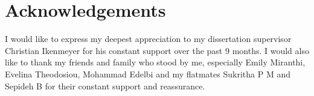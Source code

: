 \section*{Acknowledgements}

\vspace{2cm}

\large

I would like to express my deepest appreciation to my dissertation supervisor Christian
Ikenmeyer for his constant support over the past 9 months.
I would also like to thank my friends and family who stood by me, 
especially Emily Miranthi, Evelina Theodosiou, Mohammad Edelbi and my
flatmates Sukritha P M and Sepideh B for their constant support and reassurance.
